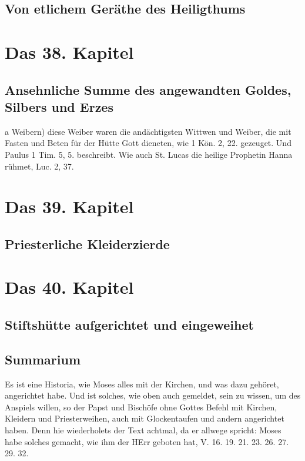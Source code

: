 \section{Von etlichem Geräthe des Heiligthums}

\chapter{Das 38. Kapitel}

\section{Ansehnliche Summe des angewandten Goldes, Silbers und Erzes}

a Weibern) diese Weiber waren die andächtigsten Wittwen und Weiber, die mit Fasten und Beten für der Hütte Gott dieneten, wie 1 Kön. 2, 22. gezeuget. Und Paulus 1 Tim. 5, 5. beschreibt. Wie auch St. Lucas die heilige Prophetin Hanna rühmet, Luc. 2, 37.

\chapter{Das 39. Kapitel}

\section{Priesterliche Kleiderzierde}

\chapter{Das 40. Kapitel}

\section{Stiftshütte aufgerichtet und eingeweihet}

\section{Summarium}

Es ist eine Historia, wie Moses alles mit der Kirchen, und was dazu gehöret, angerichtet habe. Und ist solches, wie oben auch gemeldet, sein zu wissen, um des Anspiels willen, so der Papst und Bischöfe ohne Gottes Befehl mit Kirchen, Kleidern und Priesterweihen, auch mit Glockentaufen und andern angerichtet haben. Denn hie wiederholets der Text achtmal, da er allwege spricht: Moses habe solches gemacht, wie ihm der HErr geboten hat, V. 16. 19. 21. 23. 26. 27. 29. 32.

